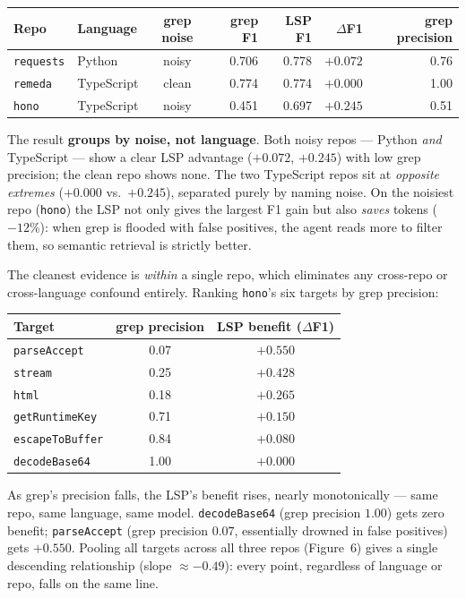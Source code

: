 \documentclass[11pt]{article}
\newcommand{\code}[1]{\texttt{#1}}
\begin{document}
\begin{center}\small
\begin{tabular}{@{}llcrrrr@{}}
\toprule
Repo & Language & grep noise & grep F1 & LSP F1 & $\Delta$F1 & grep precision \\
\midrule
\code{requests} & Python & noisy & 0.706 & 0.778 & $+0.072$ & 0.76 \\
\code{remeda} & TypeScript & clean & 0.774 & 0.774 & $+0.000$ & 1.00 \\
\code{hono} & TypeScript & noisy & 0.451 & 0.697 & $\mathbf{+0.245}$ & 0.51 \\
\bottomrule
\end{tabular}
\end{center}

The result \textbf{groups by noise, not language}. Both noisy repos --- Python \emph{and} TypeScript
--- show a clear LSP advantage ($+0.072$, $+0.245$) with low grep precision; the clean repo shows none.
The two TypeScript repos sit at \emph{opposite extremes} ($+0.000$ vs.\ $+0.245$), separated purely by
naming noise. On the noisiest repo (\code{hono}) the LSP not only gives the largest F1 gain but also
\emph{saves} tokens ($-12\%$): when grep is flooded with false positives, the agent reads more to filter
them, so semantic retrieval is strictly better.

The cleanest evidence is \emph{within} a single repo, which eliminates any cross-repo or cross-language
confound entirely. Ranking \code{hono}'s six targets by grep precision:

\begin{center}\small
\begin{tabular}{@{}lcc@{}}
\toprule
Target & grep precision & LSP benefit ($\Delta$F1) \\
\midrule
\code{parseAccept} & 0.07 & $+0.550$ \\
\code{stream} & 0.25 & $+0.428$ \\
\code{html} & 0.18 & $+0.265$ \\
\code{getRuntimeKey} & 0.71 & $+0.150$ \\
\code{escapeToBuffer} & 0.84 & $+0.080$ \\
\code{decodeBase64} & 1.00 & $+0.000$ \\
\bottomrule
\end{tabular}
\end{center}

As grep's precision falls, the LSP's benefit rises, nearly monotonically --- same repo, same language,
same model. \code{decodeBase64} (grep precision $1.00$) gets zero benefit; \code{parseAccept} (grep
precision $0.07$, essentially drowned in false positives) gets $+0.550$. Pooling all targets across all
three repos (Figure~6) gives a single descending relationship (slope ${\approx}-0.49$): every point,
regardless of language or repo, falls on the same line.
\end{document}
